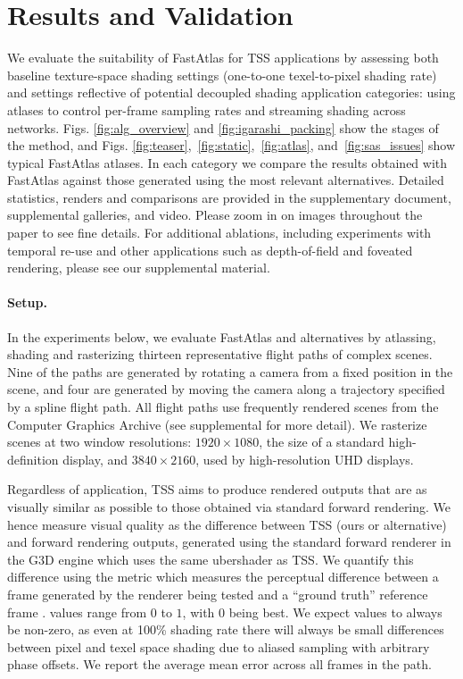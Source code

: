 \section{Results and Validation}
\label{sec:results}
\label{sec:eval}

We evaluate the suitability of FastAtlas for TSS applications by assessing both baseline texture-space shading settings (one-to-one texel-to-pixel shading rate) and settings reflective of potential decoupled shading application categories: using atlases to control per-frame sampling rates and streaming shading across networks. Figs. \ref{fig:alg_overview} and \ref{fig:igarashi_packing} show the stages of the method, and Figs. \ref{fig:teaser},~\ref{fig:static},~\ref{fig:atlas}, and~\ref{fig:sas_issues} show typical FastAtlas atlases. In each category we compare the results obtained with FastAtlas against those generated using the most relevant alternatives. Detailed statistics, renders and comparisons are provided in the supplementary document, supplemental galleries, and video. Please zoom in on images throughout the paper to see fine details. For additional ablations, including experiments with temporal re-use and other applications such as depth-of-field and foveated rendering, please see our supplemental material.

\paragraph*{Setup.}

In the experiments below, we evaluate FastAtlas and alternatives by atlassing, shading and rasterizing thirteen representative flight paths of complex scenes. Nine of the paths are generated by rotating a camera from a fixed position in the scene, and four are generated by moving the camera along a trajectory specified by a spline flight path. All flight paths use frequently rendered scenes from the Computer Graphics Archive \cite{McGuire2017Data} (see supplemental for more detail). We rasterize scenes at two window resolutions: $1920 \times 1080$, the size of a standard high-definition display, and $3840 \times 2160$, used by high-resolution UHD displays. 

Regardless of application, TSS aims to produce rendered outputs that are as visually similar as possible to those obtained via standard forward rendering. We hence measure visual quality as the difference between TSS (ours or alternative) and forward rendering outputs, generated using the standard forward renderer in the G3D engine \cite{G3D17} which uses the same ubershader as TSS. We quantify this difference using the \FLIP metric which measures the perceptual difference between a frame generated by the renderer being tested and a ``ground truth'' reference frame \cite{andersson2020FLIP}.  \FLIP values range from $0$ to $1$, with 0 being best. We expect \FLIP values to always be non-zero, as even at 100\% shading rate there will always be small differences between pixel and texel space shading due to aliased sampling with arbitrary phase offsets. We report the average mean \FLIP error across all frames in the path. 

